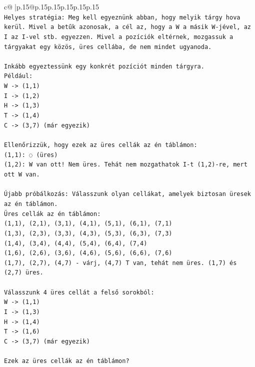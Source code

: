 \documentclass{article}
\begin{document}
{\begin{supertabular}{c@{$\;$}|p{.15\linewidth}@{}p{.15\linewidth}p{.15\linewidth}p{.15\linewidth}p{.15\linewidth}p{.15\linewidth}}
{{{\\ 
\texttt{Helyes stratégia: Meg kell egyeznünk abban, hogy melyik tárgy hova kerül. Mivel a betűk azonosak, a cél az, hogy a W a másik W{-}jével, az I az I{-}vel stb. egyezzen. Mivel a pozíciók eltérnek, mozgassuk a tárgyakat egy közös, üres cellába, de nem mindet ugyanoda.} \\
\\ 
\texttt{Inkább egyeztessünk egy konkrét pozíciót minden tárgyra.} \\
\texttt{Például:} \\
\texttt{W {-}> (1,1)} \\
\texttt{I {-}> (1,2)} \\
\texttt{H {-}> (1,3)} \\
\texttt{T {-}> (1,4)} \\
\texttt{C {-}> (3,7) (már egyezik)} \\
\\ 
\texttt{Ellenőrizzük, hogy ezek az üres cellák az én táblámon:} \\
\texttt{(1,1): ◌ (üres)} \\
\texttt{(1,2): W van ott! Nem üres. Tehát nem mozgathatok I{-}t (1,2){-}re, mert ott W van.} \\
\\ 
\texttt{Újabb próbálkozás: Válasszunk olyan cellákat, amelyek biztosan üresek az én táblámon.} \\
\texttt{Üres cellák az én táblámon:} \\
\texttt{(1,1), (2,1), (3,1), (4,1), (5,1), (6,1), (7,1)} \\
\texttt{(1,3), (2,3), (3,3), (4,3), (5,3), (6,3), (7,3)} \\
\texttt{(1,4), (3,4), (4,4), (5,4), (6,4), (7,4)} \\
\texttt{(1,6), (2,6), (3,6), (4,6), (5,6), (6,6), (7,6)} \\
\texttt{(1,7), (2,7), (4,7) {-} várj, (4,7) T van, tehát nem üres. (1,7) és (2,7) üres.} \\
\\ 
\texttt{Válasszunk 4 üres cellát a felső sorokból:} \\
\texttt{W {-}> (1,1)} \\
\texttt{I {-}> (1,3)} \\
\texttt{H {-}> (1,4)} \\
\texttt{T {-}> (1,6)} \\
\texttt{C {-}> (3,7) (már egyezik)} \\
\\ 
\texttt{Ezek az üres cellák az én táblámon?} \\
}}}
\end{supertabular}}
\end{document}
